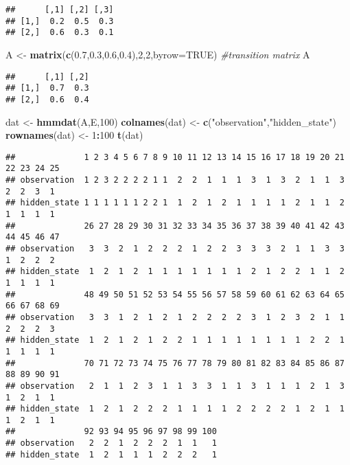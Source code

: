 \documentclass[
]{article}
\newenvironment{Shaded}{\begin{snugshade}}{\end{snugshade}}
\newcommand{\CommentTok}[1]{\textcolor[rgb]{0.56,0.35,0.01}{\textit{#1}}}
\newcommand{\DataTypeTok}[1]{\textcolor[rgb]{0.13,0.29,0.53}{#1}}
\newcommand{\DecValTok}[1]{\textcolor[rgb]{0.00,0.00,0.81}{#1}}
\newcommand{\FloatTok}[1]{\textcolor[rgb]{0.00,0.00,0.81}{#1}}
\newcommand{\KeywordTok}[1]{\textcolor[rgb]{0.13,0.29,0.53}{\textbf{#1}}}
\newcommand{\NormalTok}[1]{#1}
\newcommand{\OperatorTok}[1]{\textcolor[rgb]{0.81,0.36,0.00}{\textbf{#1}}}
\newcommand{\OtherTok}[1]{\textcolor[rgb]{0.56,0.35,0.01}{#1}}
\newcommand{\StringTok}[1]{\textcolor[rgb]{0.31,0.60,0.02}{#1}}
\begin{document}
\begin{verbatim}
##      [,1] [,2] [,3]
## [1,]  0.2  0.5  0.3
## [2,]  0.6  0.3  0.1
\end{verbatim}

\begin{Shaded}
\begin{Highlighting}[]
\NormalTok{A <-}\StringTok{ }\KeywordTok{matrix}\NormalTok{(}\KeywordTok{c}\NormalTok{(}\FloatTok{0.7}\NormalTok{,}\FloatTok{0.3}\NormalTok{,}\FloatTok{0.6}\NormalTok{,}\FloatTok{0.4}\NormalTok{),}\DecValTok{2}\NormalTok{,}\DecValTok{2}\NormalTok{,}\DataTypeTok{byrow=}\OtherTok{TRUE}\NormalTok{) }\CommentTok{#transition matrix}
\NormalTok{A}
\end{Highlighting}
\end{Shaded}

\begin{verbatim}
##      [,1] [,2]
## [1,]  0.7  0.3
## [2,]  0.6  0.4
\end{verbatim}

\begin{Shaded}
\begin{Highlighting}[]
\NormalTok{dat <-}\StringTok{ }\KeywordTok{hmmdat}\NormalTok{(A,E,}\DecValTok{100}\NormalTok{)}
\KeywordTok{colnames}\NormalTok{(dat) <-}\StringTok{ }\KeywordTok{c}\NormalTok{(}\StringTok{"observation"}\NormalTok{,}\StringTok{"hidden_state"}\NormalTok{)}
\KeywordTok{rownames}\NormalTok{(dat) <-}\StringTok{ }\DecValTok{1}\OperatorTok{:}\DecValTok{100}
\KeywordTok{t}\NormalTok{(dat)}
\end{Highlighting}
\end{Shaded}

\begin{verbatim}
##              1 2 3 4 5 6 7 8 9 10 11 12 13 14 15 16 17 18 19 20 21 22 23 24 25
## observation  1 2 3 2 2 2 2 1 1  2  2  1  1  1  3  1  3  2  1  1  3  2  2  3  1
## hidden_state 1 1 1 1 1 1 2 2 1  1  2  1  2  1  1  1  1  2  1  1  2  1  1  1  1
##              26 27 28 29 30 31 32 33 34 35 36 37 38 39 40 41 42 43 44 45 46 47
## observation   3  3  2  1  2  2  2  1  2  2  3  3  3  2  1  1  3  3  1  2  2  2
## hidden_state  1  2  1  2  1  1  1  1  1  1  1  2  1  2  2  1  1  2  1  1  1  1
##              48 49 50 51 52 53 54 55 56 57 58 59 60 61 62 63 64 65 66 67 68 69
## observation   3  3  1  2  1  2  1  2  2  2  2  3  1  2  3  2  1  1  2  2  2  3
## hidden_state  1  2  1  2  1  2  2  1  1  1  1  1  1  1  1  2  2  1  1  1  1  1
##              70 71 72 73 74 75 76 77 78 79 80 81 82 83 84 85 86 87 88 89 90 91
## observation   2  1  1  2  3  1  1  3  3  1  1  3  1  1  1  2  1  3  1  2  1  1
## hidden_state  1  2  1  2  2  2  1  1  1  1  2  2  2  2  1  2  1  1  1  2  1  1
##              92 93 94 95 96 97 98 99 100
## observation   2  2  1  2  2  2  1  1   1
## hidden_state  1  2  1  1  1  2  2  2   1
\end{verbatim}
\end{document}
